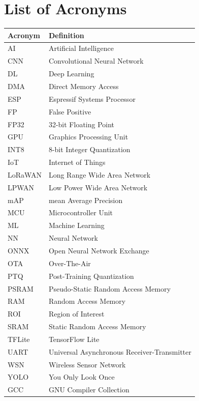 \chapter*{List of Acronyms}

\begin{table}[H]
\centering
\begin{tabular}{ll}
\hline
\textbf{Acronym} & \textbf{Definition} \\ \hline
AI & Artificial Intelligence \\
CNN & Convolutional Neural Network \\
DL & Deep Learning \\
DMA & Direct Memory Access \\
ESP & Espressif Systems Processor \\
FP & False Positive \\
FP32 & 32-bit Floating Point \\
GPU & Graphics Processing Unit \\
INT8 & 8-bit Integer Quantization \\
IoT & Internet of Things \\
LoRaWAN & Long Range Wide Area Network \\
LPWAN & Low Power Wide Area Network \\
mAP & mean Average Precision \\
MCU & Microcontroller Unit \\
ML & Machine Learning \\
NN & Neural Network \\
ONNX & Open Neural Network Exchange \\
OTA & Over-The-Air \\
PTQ & Post-Training Quantization \\
PSRAM & Pseudo-Static Random Access Memory \\
RAM & Random Access Memory \\
ROI & Region of Interest \\
SRAM & Static Random Access Memory \\
TFLite & TensorFlow Lite \\
UART & Universal Asynchronous Receiver-Transmitter \\
WSN & Wireless Sensor Network \\
YOLO & You Only Look Once \\
GCC & GNU Compiler Collection \\ \hline

\end{tabular}
\end{table}
